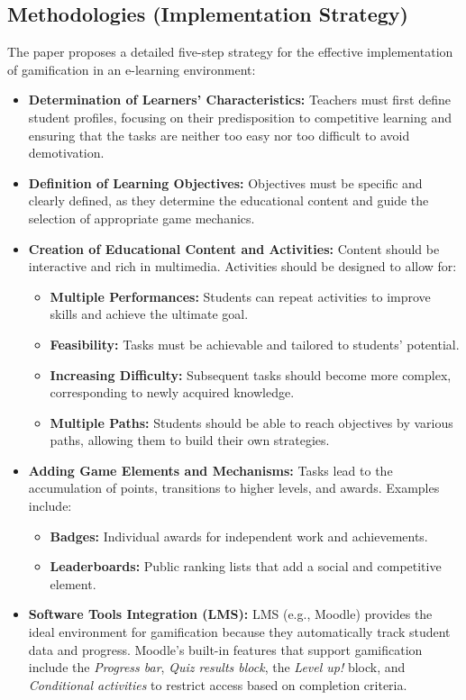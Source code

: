 \documentclass[12pt,a4paper]{report}
\begin{document}
\subsection{Methodologies (Implementation Strategy)}
The paper proposes a detailed five-step strategy for the effective implementation of gamification in an e-learning environment:
\begin{itemize}
  \item \textbf{Determination of Learners' Characteristics:} Teachers must first define student profiles, focusing on their predisposition to competitive learning and ensuring that the tasks are neither too easy nor too difficult to avoid demotivation.
  \item \textbf{Definition of Learning Objectives:} Objectives must be specific and clearly defined, as they determine the educational content and guide the selection of appropriate game mechanics.
  \item \textbf{Creation of Educational Content and Activities:} Content should be interactive and rich in multimedia. Activities should be designed to allow for:
  \begin{itemize}
    \item \textbf{Multiple Performances:} Students can repeat activities to improve skills and achieve the ultimate goal.
    \item \textbf{Feasibility:} Tasks must be achievable and tailored to students' potential.
    \item \textbf{Increasing Difficulty:} Subsequent tasks should become more complex, corresponding to newly acquired knowledge.
    \item \textbf{Multiple Paths:} Students should be able to reach objectives by various paths, allowing them to build their own strategies.
  \end{itemize}
  \item \textbf{Adding Game Elements and Mechanisms:} Tasks lead to the accumulation of points, transitions to higher levels, and awards. Examples include:
  \begin{itemize}
    \item \textbf{Badges:} Individual awards for independent work and achievements.
    \item \textbf{Leaderboards:} Public ranking lists that add a social and competitive element.
  \end{itemize}
  \item \textbf{Software Tools Integration (LMS):} LMS (e.g., Moodle) provides the ideal environment for gamification because they automatically track student data and progress. Moodle's built-in features that support gamification include the \emph{Progress bar}, \emph{Quiz results block}, the \emph{Level up!} block, and \emph{Conditional activities} to restrict access based on completion criteria.
\end{itemize}
\end{document}
